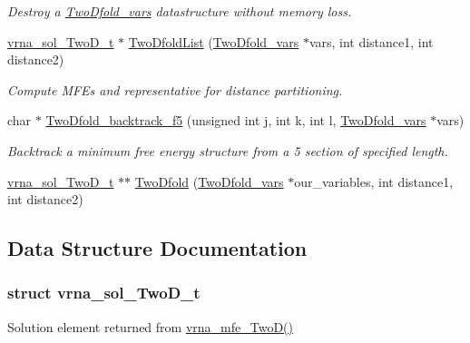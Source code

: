 \begin{DoxyCompactItemize}
\begin{DoxyCompactList}\small\item\em Destroy a \mbox{\hyperlink{group__kl__neighborhood__mfe_struct_two_dfold__vars}{Two\+Dfold\+\_\+vars}} datastructure without memory loss. \end{DoxyCompactList}\item 
\mbox{\hyperlink{group__kl__neighborhood__mfe_structvrna__sol___two_d__t}{vrna\+\_\+sol\+\_\+\+Two\+D\+\_\+t}} $\ast$ \mbox{\hyperlink{group__kl__neighborhood__mfe_ga7fc5e3e92fe97914ca4eccd33c01c2a7}{Two\+Dfold\+List}} (\mbox{\hyperlink{group__kl__neighborhood__mfe_struct_two_dfold__vars}{Two\+Dfold\+\_\+vars}} $\ast$vars, int distance1, int distance2)
\begin{DoxyCompactList}\small\item\em Compute M\+FE\textquotesingle{}s and representative for distance partitioning. \end{DoxyCompactList}\item 
char $\ast$ \mbox{\hyperlink{group__kl__neighborhood__mfe_gaf4dc05bf8fc1ea53acd7aeb798ba80c2}{Two\+Dfold\+\_\+backtrack\+\_\+f5}} (unsigned int j, int k, int l, \mbox{\hyperlink{group__kl__neighborhood__mfe_struct_two_dfold__vars}{Two\+Dfold\+\_\+vars}} $\ast$vars)
\begin{DoxyCompactList}\small\item\em Backtrack a minimum free energy structure from a 5\textquotesingle{} section of specified length. \end{DoxyCompactList}\item 
\mbox{\hyperlink{group__kl__neighborhood__mfe_structvrna__sol___two_d__t}{vrna\+\_\+sol\+\_\+\+Two\+D\+\_\+t}} $\ast$$\ast$ \mbox{\hyperlink{group__kl__neighborhood__mfe_ga9827e1deba983a95d0509d36b61fb0e2}{Two\+Dfold}} (\mbox{\hyperlink{group__kl__neighborhood__mfe_struct_two_dfold__vars}{Two\+Dfold\+\_\+vars}} $\ast$our\+\_\+variables, int distance1, int distance2)
\end{DoxyCompactItemize}


\subsection{Data Structure Documentation}
\label{structvrna__sol___two_d__t}
\subsubsection{struct vrna\+\_\+sol\+\_\+\+Two\+D\+\_\+t}
Solution element returned from \mbox{\hyperlink{group__kl__neighborhood__mfe_ga243c288b463147352829df04de6a2f77}{vrna\+\_\+mfe\+\_\+\+Two\+D()}} 

